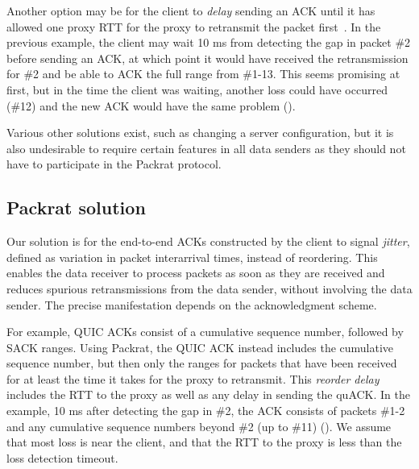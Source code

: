 Another option may be for the client to \textit{delay} sending an ACK until it
has allowed one proxy RTT for the proxy to retransmit the packet first~\cite{rfc3168}.
In the
previous example, the client may wait 10 ms from detecting the gap in
packet \#2 before sending an ACK, at which point it would have received the
retransmission for \#2 and be able to ACK the full range from \#1-13. This
seems promising at first, but in the time the client was waiting,
another loss could have occurred (\#12)
and the new ACK would have the same problem ().

Various other solutions exist, such as changing a server configuration, but it
is also undesirable to require certain features in all data senders as they
should not have to participate in the Packrat protocol.

\subsection{Packrat solution}
\label{sec:packrat:problem:packrat}

Our solution is for the end-to-end ACKs constructed by the client to
signal \textit{jitter}, defined as variation in packet interarrival times,
instead of reordering. This enables the data receiver to process packets as
soon as they are received and reduces spurious retransmissions from the data
sender, without involving the data sender. The precise manifestation depends on
the acknowledgment scheme.

For example, QUIC ACKs consist of a cumulative sequence number, followed by SACK
ranges. Using Packrat, the QUIC ACK instead includes the cumulative sequence
number, but then only the ranges for packets that have been received for at
least the time it takes for the proxy to retransmit. This
\textit{reorder delay} includes the RTT to the proxy
as well as any delay in sending the quACK.
In the example, 10 ms after detecting the gap in \#2, the ACK consists
of packets \#1-2 and any cumulative sequence numbers beyond \#2 (up to \#11)
().
We assume
that most loss is near the client, and that the RTT to the proxy is less than
the loss detection timeout.

